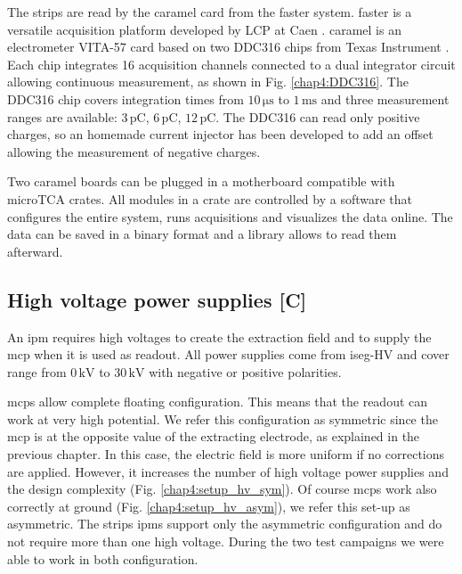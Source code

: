 \begin{refsection}
  The strips are read by the \acrshort{caramel} card \cite{caramel2013} from the \acrshort{faster} system. \acrshort{faster} is a versatile acquisition platform developed by LCP at Caen \cite{faster2013}. \acrshort{caramel} is an electrometer VITA-57 card based on two DDC316 chips from Texas Instrument \cite{ddc316}. Each chip integrates 16 acquisition channels connected to a dual integrator circuit allowing continuous measurement, as shown in Fig. \ref{chap4:DDC316}. The DDC316 chip covers integration times from $10\,\mathrm{\mu s}$ to $1\,\mathrm{ms}$ and three measurement ranges are available: $3\,\mathrm{pC}$, $6\,\mathrm{pC}$, $12\,\mathrm{pC}$. The DDC316 can read only positive charges, so an homemade current injector has been developed to add an offset allowing the measurement of negative charges.
  

  Two \acrshort{caramel} boards can be plugged in a motherboard compatible with microTCA crates. All modules in a crate are controlled by a software that configures the entire system, runs acquisitions and visualizes \cite{rhb2012} the data online. The data can be saved in a binary format and a library allows to read them afterward.

  \subsection{High voltage power supplies [C]}
  An \acrshort{ipm} requires high voltages to create the extraction field and to supply the \acrshort{mcp} when it is used as readout. All power supplies come from iseg-HV \cite{iseg2019} and cover range from $0\,\mathrm{kV}$ to $30\,\mathrm{kV}$ with negative or positive polarities.

  \acrshort{mcp}s allow complete floating configuration. This means that the readout can work at very high potential. We refer this configuration as symmetric since the \acrshort{mcp} is at the opposite value of the extracting electrode, as explained in the previous chapter. In this case, the electric field is more uniform if no corrections are applied. However, it increases the number of high voltage power supplies and the design complexity (Fig. \ref{chap4:setup_hv_sym}).
  Of course \acrshort{mcp}s work also correctly at ground (Fig. \ref{chap4:setup_hv_asym}), we refer this set-up as asymmetric. The strips \acrshort{ipm}s support only the asymmetric configuration and do not require more than one high voltage. During the two test campaigns we were able to work in both configuration.


\end{refsection}
